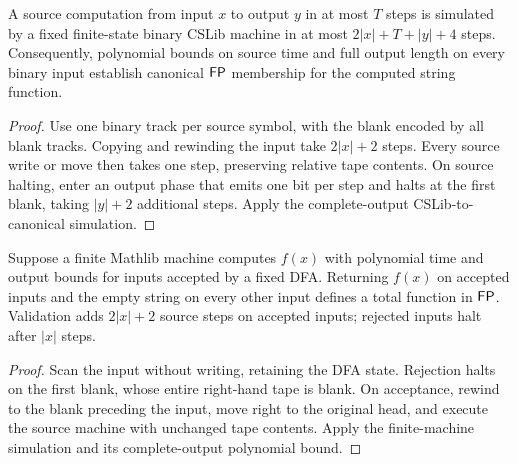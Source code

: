 \begin{theorem}
  \label{thm:mathlib-tm0-canonical-fp}
  \leanok
  A source computation from input $x$ to output $y$ in at most $T$ steps
  is simulated by a fixed finite-state binary CSLib machine in at most
  $2|x|+T+|y|+4$ steps. Consequently, polynomial bounds on source time
  and full output length on every binary input establish canonical
  $\mathsf{FP}$ membership for the computed string function.
\end{theorem}
\begin{proof}
  \leanok
  Use one binary track per source symbol, with the blank encoded by all
  blank tracks. Copying and rewinding the input take $2|x|+2$ steps.
  Every source write or move then takes one step, preserving relative
  tape contents. On source halting, enter an output phase that emits one
  bit per step and halts at the first blank, taking $|y|+2$ additional
  steps. Apply the complete-output CSLib-to-canonical simulation.
\end{proof}

\begin{theorem}
  \label{thm:mathlib-tm0-regular-guard}
  \leanok
  Suppose a finite Mathlib machine computes $f(x)$ with polynomial time
  and output bounds for inputs accepted by a fixed DFA. Returning $f(x)$
  on accepted inputs and the empty string on every other input defines a
  total function in $\mathsf{FP}$. Validation adds $2|x|+2$ source steps on
  accepted inputs; rejected inputs halt after $|x|$ steps.
\end{theorem}
\begin{proof}
  \leanok
  Scan the input without writing, retaining the DFA state. Rejection halts
  on the first blank, whose entire right-hand tape is blank. On acceptance,
  rewind to the blank preceding the input, move right to the original head,
  and execute the source machine with unchanged tape contents. Apply the
  finite-machine simulation and its complete-output polynomial bound.
\end{proof}

